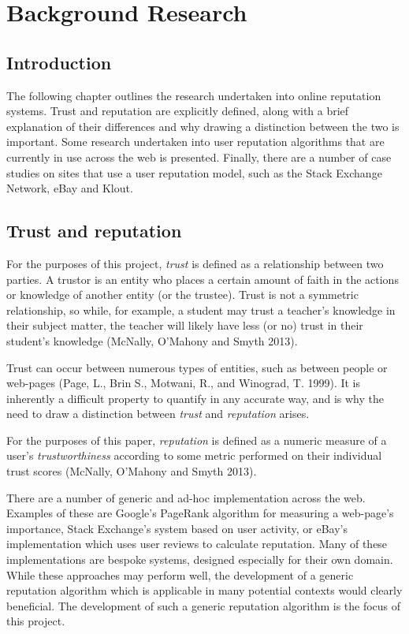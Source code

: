 \documentclass[]{final_report}
\begin{document}
\chapter{Background Research}


\section{Introduction}

The following chapter outlines the research undertaken into online reputation systems. Trust and reputation are explicitly defined, along with a brief explanation of their differences and why drawing a distinction between the two is important. Some research undertaken into user reputation algorithms that are currently in use across the web is presented. Finally, there are a number of case studies on sites that use a user reputation model, such as the Stack Exchange Network, eBay and Klout.


\section{Trust and reputation}

For the purposes of this project, \textsl{trust} is defined as a relationship between two parties. A trustor is an entity who places a certain amount of faith in the actions or knowledge of another entity (or the trustee). Trust is not a symmetric relationship, so while, for example, a student may trust a teacher's knowledge in their subject matter, the teacher will likely have less (or no) trust in their student's knowledge  (McNally, O'Mahony and Smyth 2013).

Trust can occur between numerous types of entities, such as between people or web-pages (Page, L., Brin S., Motwani, R., and Winograd, T. 1999). It is inherently a difficult property to quantify in any accurate way, and is why the need to draw a distinction between \textsl{trust} and \textsl{reputation} arises.

For the purposes of this paper, \textsl{reputation} is defined as a numeric measure of a user's \textsl{trustworthiness} according to some metric performed on their individual trust scores (McNally, O'Mahony and Smyth 2013).

There are a number of generic and ad-hoc implementation across the web. Examples of these are Google's PageRank algorithm for measuring a web-page's importance, Stack Exchange's system based on user activity, or eBay's implementation which uses user reviews to calculate reputation. Many of these implementations are bespoke systems, designed especially for their own domain. While these approaches may perform well, the development of a generic reputation algorithm which is applicable in many potential contexts would clearly beneficial. The development of such a generic reputation algorithm is the focus of this project.
\end{document}
